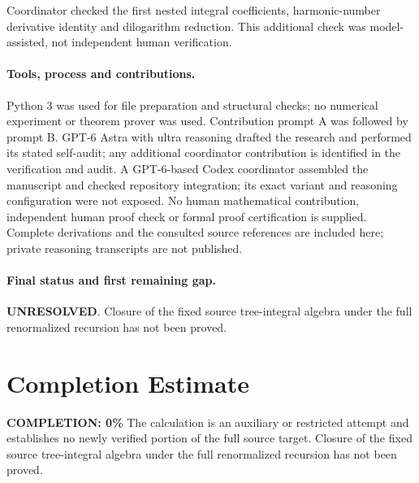 \documentclass[11pt]{article}
\begin{document}
Coordinator checked the first nested integral coefficients, harmonic-number derivative identity and dilogarithm reduction. This additional check was model-assisted, not independent human verification.

\paragraph{Tools, process and contributions.}
Python 3 was used for file preparation and structural checks; no numerical experiment or theorem prover was used. Contribution prompt A was followed by prompt B. GPT-6 Astra with ultra reasoning drafted the research and performed its stated self-audit; any additional coordinator contribution is identified in the verification and audit. A GPT-6-based Codex coordinator assembled the manuscript and checked repository integration; its exact variant and reasoning configuration were not exposed. No human mathematical contribution, independent human proof check or formal proof certification is supplied. Complete derivations and the consulted source references are included here; private reasoning transcripts are not published.

\paragraph{Final status and first remaining gap.}
\textbf{UNRESOLVED}. Closure of the fixed source tree-integral algebra under the full renormalized recursion has not been proved.

\section{Completion Estimate}
\noindent\textbf{COMPLETION: 0\%}
The calculation is an auxiliary or restricted attempt and establishes no newly verified portion of the full source target. Closure of the fixed source tree-integral algebra under the full renormalized recursion has not been proved.
\end{document}

